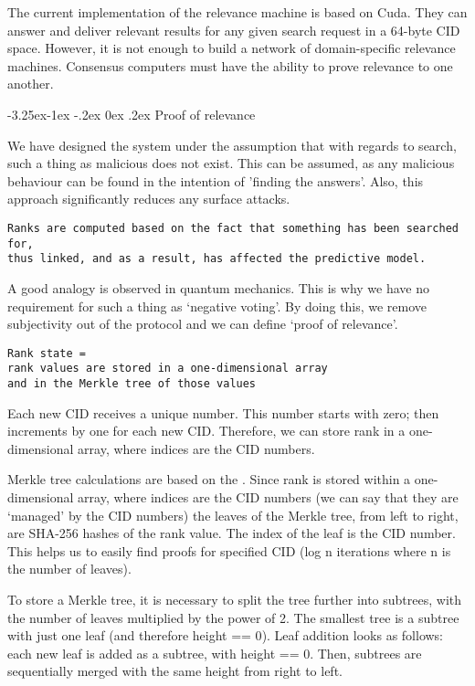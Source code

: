 \documentclass[8pt,oneside]{amsart}
\makeatletter
\newcommand{\linkgreen}[2]{\href{#1}{\color{green}{#2}}}
\renewcommand\subsection{\@startsection{subsection}{2}{\z@}%
                                     {-3.25ex\@plus -1ex \@minus -.2ex}%
                                     {0ex \@plus .2ex}%
                                     {\play\Large}}%
\newcommand{\titleSection}[1]{\subsection{#1}}
\newcommand{\code}[1]{{\PlayBold #1}}
\makeatother
\begin{document}
\begin{Abstract}
The current implementation of the relevance machine is based on Cuda. They can answer and deliver relevant results for any given search request in a 64-byte CID space. However, it is not enough to build a network of domain-specific relevance machines. Consensus computers must have the ability to prove relevance to one another.

\titleSection{Proof of relevance}\label{Proof of relevance}

We have designed the system under the assumption that with regards to search, such a thing as malicious does not exist. This can be assumed, as any malicious behaviour can be found in the intention of 'finding the answers'. Also, this approach significantly reduces any surface attacks.

\begin{lstlisting}
Ranks are computed based on the fact that something has been searched for,
thus linked, and as a result, has affected the predictive model.
\end{lstlisting}

A good analogy is observed in quantum mechanics. This is why we have no requirement for such a thing as ‘negative voting’. By doing this, we remove subjectivity out of the protocol and we can define ‘proof of relevance’.

\begin{lstlisting}
Rank state =
rank values are stored in a one-dimensional array
and in the Merkle tree of those values
\end{lstlisting}

Each new CID receives a unique number. This number starts with zero; then increments by one for each new CID. Therefore, we can store rank in a one-dimensional array, where indices are the CID numbers.

Merkle tree calculations are based on the \linkgreen{https://tools.ietf.org/html/rfc6962#section-2.1}{RFC-6962 standard}. Since rank is stored within a one-dimensional array, where indices are the CID numbers (we can say that they are ‘managed’ by the CID numbers) the leaves of the Merkle tree, from left to right, are \code{SHA-256} hashes of the rank value. The index of the leaf is the CID number. This helps us to easily find proofs for specified CID (\code{log n} iterations where \code{n} is the number of leaves).

To store a Merkle tree, it is necessary to split the tree further into subtrees, with the number of leaves multiplied by the power of 2. The smallest tree is a subtree with just one leaf (and therefore \code{height == 0}). Leaf addition looks as follows: each new leaf is added as a subtree, with \code{height == 0}. Then, subtrees are sequentially merged with the same \code{height} from right to left.


\end{Abstract}
\end{document}
